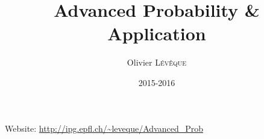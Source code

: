 

\title{Advanced Probability \& Application}
\author{Olivier \textsc{Lévêque}}
\date{2015-2016}


\maketitle
\tableofcontents

\newpage

Website: \url{http://ipg.epfl.ch/~leveque/Advanced_Prob}



\nocite{*}







